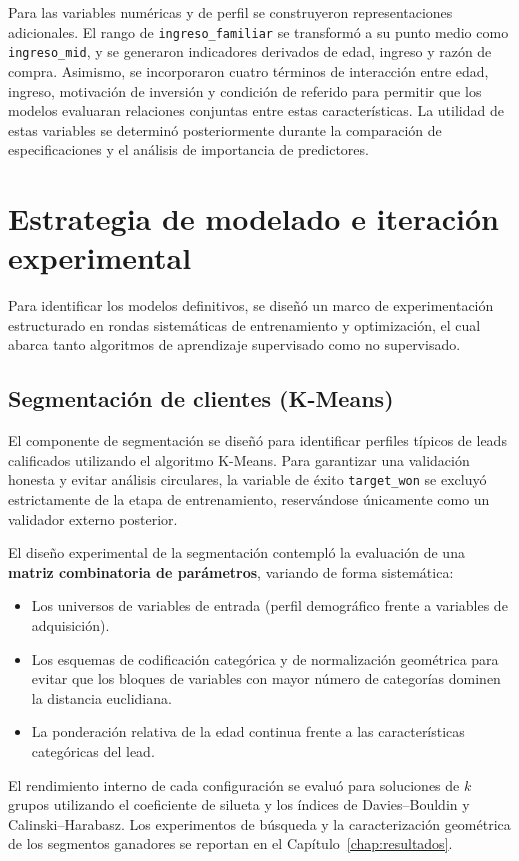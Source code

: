 Para las variables numéricas y de perfil se construyeron representaciones adicionales. El rango de \texttt{ingreso\_familiar} se transformó a su punto medio como \texttt{ingreso\_mid}, y se generaron indicadores derivados de edad, ingreso y razón de compra. Asimismo, se incorporaron cuatro términos de interacción entre edad, ingreso, motivación de inversión y condición de referido para permitir que los modelos evaluaran relaciones conjuntas entre estas características. La utilidad de estas variables se determinó posteriormente durante la comparación de especificaciones y el análisis de importancia de predictores.

\section{Estrategia de modelado e iteración experimental}
Para identificar los modelos definitivos, se diseñó un marco de experimentación estructurado en rondas sistemáticas de entrenamiento y optimización, el cual abarca tanto algoritmos de aprendizaje supervisado como no supervisado.


\subsection{Segmentación de clientes (K-Means)}
El componente de segmentación se diseñó para identificar perfiles típicos de leads calificados utilizando el algoritmo K-Means. Para garantizar una validación honesta y evitar análisis circulares, la variable de éxito \texttt{target\_won} se excluyó estrictamente de la etapa de entrenamiento, reservándose únicamente como un validador externo posterior.

El diseño experimental de la segmentación contempló la evaluación de una \textbf{matriz combinatoria de parámetros}, variando de forma sistemática:
\begin{itemize}
    \item Los universos de variables de entrada (perfil demográfico frente a variables de adquisición).
    \item Los esquemas de codificación categórica y de normalización geométrica para evitar que los bloques de variables con mayor número de categorías dominen la distancia euclidiana.
    \item La ponderación relativa de la edad continua frente a las características categóricas del lead.
\end{itemize}
El rendimiento interno de cada configuración se evaluó para soluciones de $k$ grupos utilizando el coeficiente de silueta y los índices de Davies--Bouldin y Calinski--Harabasz. Los experimentos de búsqueda y la caracterización geométrica de los segmentos ganadores se reportan en el Capítulo~\ref{chap:resultados}.

